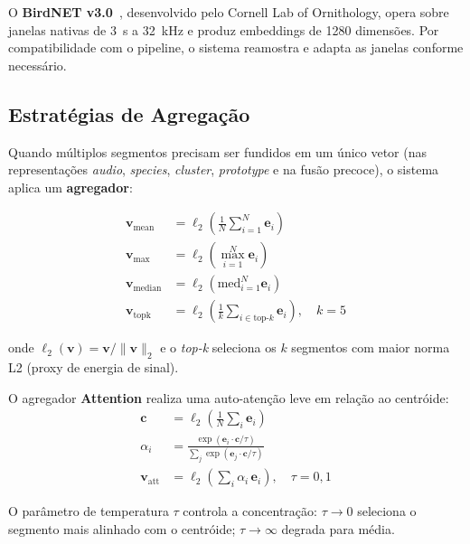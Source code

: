 \documentclass[12pt,a4paper]{article}
\begin{document}
O \textbf{BirdNET v3.0}~\cite{kahl:21}, desenvolvido pelo Cornell Lab of
Ornithology, opera sobre janelas nativas de 3~s a 32~kHz e produz embeddings de
1280 dimensões. Por compatibilidade com o pipeline, o sistema reamostra e
adapta as janelas conforme necessário.

\subsection{Estratégias de Agregação}

Quando múltiplos segmentos precisam ser fundidos em um único vetor (nas
representações \emph{audio}, \emph{species}, \emph{cluster}, \emph{prototype}
e na fusão precoce), o sistema aplica um \textbf{agregador}:

\begin{align}
  \mathbf{v}_{\text{mean}}   &= \ell_2\!\left(\frac{1}{N}\sum_{i=1}^N \mathbf{e}_i\right)
  \label{eq:agg_mean}\\[4pt]
  \mathbf{v}_{\text{max}}    &= \ell_2\!\left(\max_{i=1}^N \mathbf{e}_i\right)
  \label{eq:agg_max}\\[4pt]
  \mathbf{v}_{\text{median}} &= \ell_2\!\left(\text{med}_{i=1}^N \mathbf{e}_i\right)
  \label{eq:agg_median}\\[4pt]
  \mathbf{v}_{\text{topk}}   &= \ell_2\!\left(\frac{1}{k}\sum_{i \in \text{top-}k} \mathbf{e}_i\right),
    \quad k=5
  \label{eq:agg_topk}
\end{align}

onde $\ell_2(\mathbf{v}) = \mathbf{v}/\|\mathbf{v}\|_2$ e o \emph{top-k} seleciona
os $k$ segmentos com maior norma L2 (proxy de energia de sinal).

O agregador \textbf{Attention} realiza uma auto-atenção leve em relação ao centróide:
\begin{align}
  \mathbf{c} &= \ell_2\!\left(\tfrac{1}{N}\textstyle\sum_i \mathbf{e}_i\right)
  \label{eq:att_centroid}\\
  \alpha_i   &= \frac{\exp\!\left(\mathbf{e}_i \cdot \mathbf{c} / \tau\right)}
                     {\sum_j \exp\!\left(\mathbf{e}_j \cdot \mathbf{c} / \tau\right)}
  \label{eq:att_score}\\
  \mathbf{v}_{\text{att}} &= \ell_2\!\left(\sum_i \alpha_i\,\mathbf{e}_i\right),
  \quad \tau = 0{,}1
  \label{eq:att_out}
\end{align}

O parâmetro de temperatura $\tau$ controla a concentração: $\tau \to 0$
seleciona o segmento mais alinhado com o centróide; $\tau \to \infty$ degrada
para média.
\end{document}
